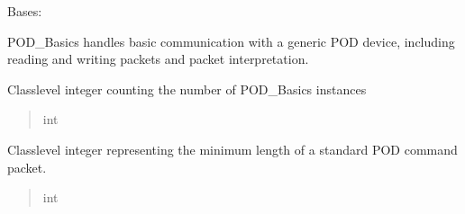 \documentclass[letterpaper,10pt,english]{sphinxmanual}
\begin{document}
\begin{fulllineitems}
\label{\detokenize{BasicPodProtocol:BasicPodProtocol.POD_Basics}}
\pysigstartsignatures
{}
\pysigstopsignatures
\sphinxAtStartPar
Bases: 

\sphinxAtStartPar
POD\_Basics handles basic communication with a generic POD device, including reading and writing
packets and packet interpretation.

\begin{fulllineitems}
\label{\detokenize{BasicPodProtocol:BasicPodProtocol.POD_Basics.__numPod}}
\pysigstartsignatures
{}
\pysigstopsignatures
\sphinxAtStartPar
Class\sphinxhyphen{}level integer counting the number of POD\_Basics instances
\begin{quote}\begin{description}
\sphinxAtStartPar
int

\end{description}\end{quote}

\end{fulllineitems}


\begin{fulllineitems}
\label{\detokenize{BasicPodProtocol:BasicPodProtocol.POD_Basics.__MINSTANDARDLENGTH}}
\pysigstartsignatures
{}
\pysigstopsignatures
\sphinxAtStartPar
Class\sphinxhyphen{}level integer representing the minimum length of a standard             POD command packet.
\begin{quote}\begin{description}
\sphinxAtStartPar
int


\end{description}
\end{quote}
\end{fulllineitems}
\end{fulllineitems}
\end{document}
